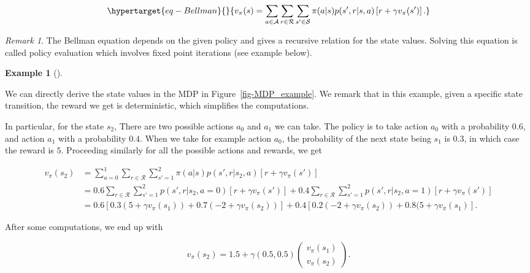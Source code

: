 \documentclass[
  letterpaper,
]{report}
\theoremstyle{plain}
\theoremstyle{definition}
\newtheorem{example}{Example}[chapter]
\theoremstyle{definition}
\theoremstyle{remark}
\newtheorem*{remark}{Remark}
\begin{document}
\begin{equation}\protect\hypertarget{eq-Bellman}{}{
v_\pi(s) = \sum_{a\in\mathcal{A}}\sum_{r\in\mathcal{R}}\sum_{s'\in\mathcal{S}}\pi(a|s)p(s',r|s,a)\left[ r + \gamma v_\pi(s')\right].
}\label{eq-Bellman}\end{equation}

\begin{remark}

The Bellman equation depends on the given policy and gives a recursive
relation for the state values. Solving this equation is called policy
evaluation which involves fixed point iterations (see example below).

\end{remark}

\leavevmode{}%
\begin{example}[]\label{exm-the_example}

We can directly derive the state values in the MDP in
Figure~\ref{fig-MDP_example}. We remark that in this example, given a
specific state transition, the reward we get is deterministic, which
simplifies the computations.

In particular, for the state \(s_2\), There are two possible actions
\(a_0\) and \(a_1\) we can take. The policy is to take action \(a_0\)
with a probability \(0.6\), and action \(a_1\) with a probability
\(0.4\). When we take for example action \(a_0\), the probability of the
next state being \(s_1\) is \(0.3\), in which case the reward is \(5\).
Proceeding similarly for all the possible actions and rewards, we get

\begin{align*}
v_\pi(s_2) &= \sum_{a=0}^1\sum_{r\in\mathcal{R}}\sum_{s'=1}^2\pi(a|s)p(s',r|s_2,a)\left[ r + \gamma v_\pi(s')\right]\\
&= 0.6 \sum_{r\in\mathcal{R}}\sum_{s'=1}^2 p(s',r|s_2,a=0)\left[ r + \gamma v_\pi(s')\right] + 0.4 \sum_{r\in\mathcal{R}}\sum_{s'=1}^2 p(s',r|s_2,a=1)\left[ r + \gamma v_\pi(s')\right]\\
&= 0.6 \left[0.3(5 + \gamma v_\pi(s_1)) + 0.7(-2 + \gamma v_\pi(s_2))\right] + 0.4\left[ 0.2(-2 + \gamma v_\pi(s_2)) + 0.8(5+\gamma v_\pi(s_1) \right].
\end{align*}

After some computations, we end up with

\[
v_\pi(s_2) = 1.5 + \gamma (0.5,0.5)\begin{pmatrix}
v_\pi(s_1) \\
v_\pi(s_2)
\end{pmatrix}.
\]


\end{example}
\end{document}
